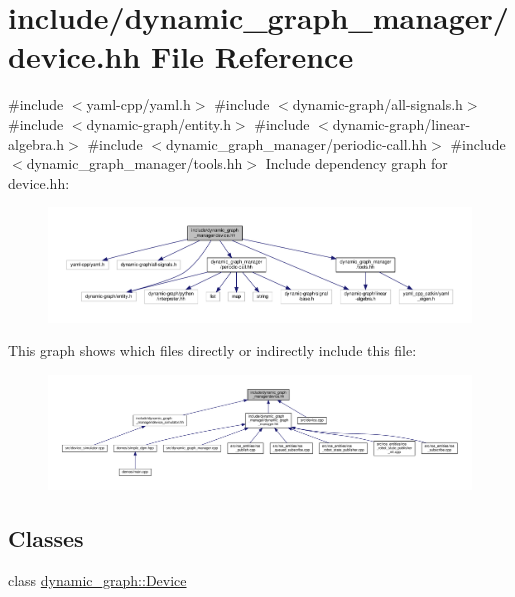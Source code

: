 \hypertarget{device_8hh}{}\section{include/dynamic\+\_\+graph\+\_\+manager/device.hh File Reference}
\label{device_8hh}
{\ttfamily \#include $<$yaml-\/cpp/yaml.\+h$>$}\newline
{\ttfamily \#include $<$dynamic-\/graph/all-\/signals.\+h$>$}\newline
{\ttfamily \#include $<$dynamic-\/graph/entity.\+h$>$}\newline
{\ttfamily \#include $<$dynamic-\/graph/linear-\/algebra.\+h$>$}\newline
{\ttfamily \#include $<$dynamic\+\_\+graph\+\_\+manager/periodic-\/call.\+hh$>$}\newline
{\ttfamily \#include $<$dynamic\+\_\+graph\+\_\+manager/tools.\+hh$>$}\newline
Include dependency graph for device.\+hh\+:
\nopagebreak
\begin{figure}[H]
\begin{center}
\leavevmode
\includegraphics[width=350pt]{device_8hh__incl}
\end{center}
\end{figure}
This graph shows which files directly or indirectly include this file\+:
\nopagebreak
\begin{figure}[H]
\begin{center}
\leavevmode
\includegraphics[width=350pt]{device_8hh__dep__incl}
\end{center}
\end{figure}
\subsection*{Classes}
\begin{DoxyCompactItemize}
\item 
class \hyperlink{classdynamic__graph_1_1Device}{dynamic\+\_\+graph\+::\+Device}
\end{DoxyCompactItemize}
